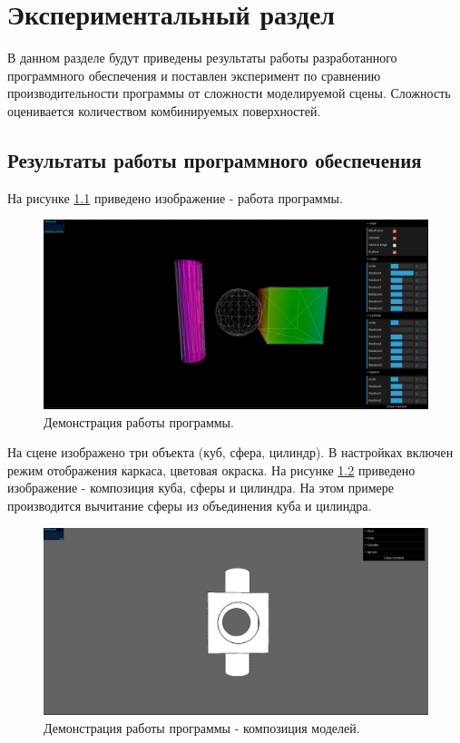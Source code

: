 \chapter{Экспериментальный раздел}
\label{cha:research}

В данном разделе будут приведены результаты работы разработанного
программного обеспечения и поставлен эксперимент по сравнению производительности
программы от сложности моделируемой сцены. Сложность оценивается количеством комбинируемых поверхностей.

\section{Результаты работы программного обеспечения}
На рисунке \ref{fig:example_run} приведено изображение - работа программы. 
\begin{figure}
  \centering
  \includegraphics[scale=0.4]{inc/img/example_run}
  \caption{Демонстрация работы программы.}
  \label{fig:example_run}
\end{figure}

На сцене изображено три объекта (куб, сфера, цилиндр).
В настройках включен режим отображения каркаса, цветовая окраска.
\newpage
На рисунке \ref{fig:example_run_base} приведено изображение - композиция куба, 
сферы и цилиндра. 
На этом примере производится вычитание сферы из объединения куба и цилиндра.
\begin{figure}
  \centering
  \includegraphics[scale=0.4]{inc/img/example_run_base}
  \caption{Демонстрация работы программы - композиция моделей.}
  \label{fig:example_run_base}
\end{figure}

